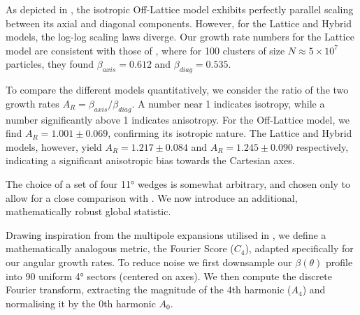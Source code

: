 \documentclass[12pt, a4paper, oneside]{report}
\theoremstyle{remark}
\begin{document}
As depicted in , the isotropic Off-Lattice model exhibits perfectly parallel scaling between its axial and diagonal components. However, for the Lattice and Hybrid models, the log-log scaling laws diverge. 
Our growth rate numbers for the Lattice model are consistent with those of \cite{Grebenkov2017}, where for 100 clusters of size $N \approx 5 \times 10^7$ particles, they found $\beta_{axis} = 0.612$ and $\beta_{diag} = 0.535$. %

To compare the different models quantitatively, we consider the ratio of the two growth rates $A_R=\beta_{axis}/\beta_{diag}$. A number near 1 indicates isotropy, while a number significantly above 1 indicates anisotropy. For the Off-Lattice model, we find $A_R = 1.001 \pm 0.069$, confirming its isotropic nature. The Lattice and Hybrid models, however, yield $A_R = 1.217 \pm 0.084$ and $A_R = 1.245 \pm 0.090$ respectively, indicating a significant anisotropic bias towards the Cartesian axes.

The choice of a set of four 11° wedges is somewhat arbitrary, and chosen only to allow for a close comparison with \cite{Grebenkov2017}. We now introduce an additional, mathematically robust global statistic. 

Drawing inspiration from the multipole expansions utilised in \cite{Ball2002}, we define a mathematically analogous metric, the Fourier Score ($C_4$), adapted specifically for our angular growth rates. To reduce noise we first downsample our $\beta(\theta)$ profile into 90 uniform 4° sectors (centered on axes). We then compute the discrete Fourier transform, extracting the magnitude of the 4th harmonic ($A_4$) and normalising it by the 0th harmonic $A_0$. 
\end{document}
